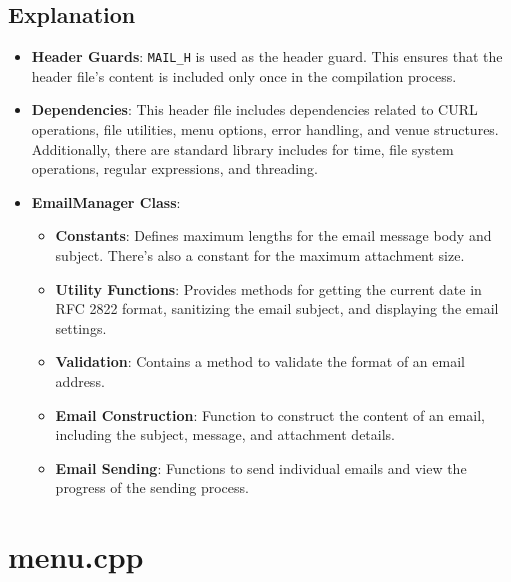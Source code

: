 \documentclass{article}
\begin{document}
	\subsection*{Explanation}
	\begin{itemize}
		\item \textbf{Header Guards}: \texttt{MAIL\_H} is used as the header guard. This ensures that the header file's content is included only once in the compilation process.
		\item \textbf{Dependencies}: This header file includes dependencies related to CURL operations, file utilities, menu options, error handling, and venue structures. Additionally, there are standard library includes for time, file system operations, regular expressions, and threading.
		\item \textbf{EmailManager Class}: 
		\begin{itemize}
			\item \textbf{Constants}: Defines maximum lengths for the email message body and subject. There's also a constant for the maximum attachment size.
			\item \textbf{Utility Functions}: Provides methods for getting the current date in RFC 2822 format, sanitizing the email subject, and displaying the email settings.
			\item \textbf{Validation}: Contains a method to validate the format of an email address.
			\item \textbf{Email Construction}: Function to construct the content of an email, including the subject, message, and attachment details.
			\item \textbf{Email Sending}: Functions to send individual emails and view the progress of the sending process.
		\end{itemize}
	\end{itemize}
	
	\newpage{}
	\section{menu.cpp}
	
\end{document}
